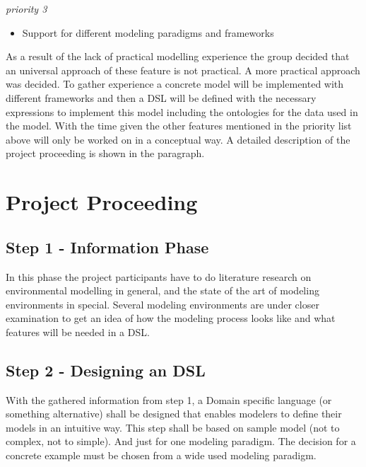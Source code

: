 \emph{priority 3}
\begin{itemize}
	\item Support for different modeling paradigms and frameworks
\end{itemize}

As a result of the lack of practical modelling experience the group decided that an universal approach of these feature is not practical. A more practical approach was decided. To gather experience a concrete model will be implemented with different frameworks and then a DSL will be defined with the necessary expressions to implement this model including the ontologies for the data used in the model. With the time given the other features mentioned in the priority list above will only be worked on in a conceptual way.
A detailed description of the project proceeding is shown in the paragraph.


\section{Project Proceeding}
\subsection{Step 1 - Information Phase}
In this phase the project participants have to do literature research on environmental modelling in general, and the state of the art of modeling environments in special.
Several modeling environments are under closer examination to get an idea of how the modeling process looks like and what features will be needed in a DSL.

\subsection{Step 2 - Designing an DSL}
With the gathered information from step 1, a Domain specific language (or something alternative) shall be designed that enables modelers to define their models in an intuitive way.
This step shall be based on sample model (not to complex, not to simple). And just for one modeling paradigm. The decision for a concrete example must be chosen from a wide used modeling paradigm.

